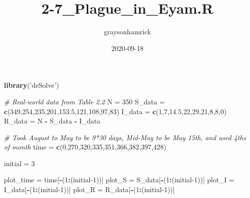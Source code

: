 \documentclass[
]{article}
\title{2-7\_Plague\_in\_Eyam.R}
\author{graysonhamrick}
\date{2020-09-18}
\newenvironment{Shaded}{\begin{snugshade}}{\end{snugshade}}
\newcommand{\CommentTok}[1]{\textcolor[rgb]{0.56,0.35,0.01}{\textit{#1}}}
\newcommand{\DecValTok}[1]{\textcolor[rgb]{0.00,0.00,0.81}{#1}}
\newcommand{\FloatTok}[1]{\textcolor[rgb]{0.00,0.00,0.81}{#1}}
\newcommand{\KeywordTok}[1]{\textcolor[rgb]{0.13,0.29,0.53}{\textbf{#1}}}
\newcommand{\NormalTok}[1]{#1}
\newcommand{\OperatorTok}[1]{\textcolor[rgb]{0.81,0.36,0.00}{\textbf{#1}}}
\newcommand{\StringTok}[1]{\textcolor[rgb]{0.31,0.60,0.02}{#1}}
\begin{document}
\maketitle

\begin{Shaded}
\begin{Highlighting}[]
\KeywordTok{library}\NormalTok{(}\StringTok{'deSolve'}\NormalTok{)}

\CommentTok{# Real-world data from Table 2.2}
\NormalTok{N =}\StringTok{ }\DecValTok{350}
\NormalTok{S_data =}\StringTok{ }\KeywordTok{c}\NormalTok{(}\DecValTok{349}\NormalTok{,}\DecValTok{254}\NormalTok{,}\DecValTok{235}\NormalTok{,}\DecValTok{201}\NormalTok{,}\FloatTok{153.5}\NormalTok{,}\DecValTok{121}\NormalTok{,}\DecValTok{108}\NormalTok{,}\DecValTok{97}\NormalTok{,}\DecValTok{83}\NormalTok{)}
\NormalTok{I_data =}\StringTok{ }\KeywordTok{c}\NormalTok{(}\DecValTok{1}\NormalTok{,}\DecValTok{7}\NormalTok{,}\FloatTok{14.5}\NormalTok{,}\DecValTok{22}\NormalTok{,}\DecValTok{29}\NormalTok{,}\DecValTok{21}\NormalTok{,}\DecValTok{8}\NormalTok{,}\DecValTok{8}\NormalTok{,}\DecValTok{0}\NormalTok{)}
\NormalTok{R_data =}\StringTok{ }\NormalTok{N }\OperatorTok{-}\StringTok{ }\NormalTok{S_data }\OperatorTok{-}\StringTok{ }\NormalTok{I_data}

\CommentTok{# Took August to May to be 9*30 days, Mid-May to be May 15th, and used 4ths of month}
\NormalTok{time =}\StringTok{ }\KeywordTok{c}\NormalTok{(}\DecValTok{0}\NormalTok{,}\DecValTok{270}\NormalTok{,}\DecValTok{320}\NormalTok{,}\DecValTok{335}\NormalTok{,}\DecValTok{351}\NormalTok{,}\DecValTok{366}\NormalTok{,}\DecValTok{382}\NormalTok{,}\DecValTok{397}\NormalTok{,}\DecValTok{428}\NormalTok{)}

\NormalTok{initial =}\StringTok{ }\DecValTok{3}

\NormalTok{plot_time =}\StringTok{ }\NormalTok{time[}\OperatorTok{-}\NormalTok{(}\DecValTok{1}\OperatorTok{:}\NormalTok{(initial}\DecValTok{-1}\NormalTok{))]}
\NormalTok{plot_S =}\StringTok{ }\NormalTok{S_data[}\OperatorTok{-}\NormalTok{(}\DecValTok{1}\OperatorTok{:}\NormalTok{(initial}\DecValTok{-1}\NormalTok{))]}
\NormalTok{plot_I =}\StringTok{ }\NormalTok{I_data[}\OperatorTok{-}\NormalTok{(}\DecValTok{1}\OperatorTok{:}\NormalTok{(initial}\DecValTok{-1}\NormalTok{))]}
\NormalTok{plot_R =}\StringTok{ }\NormalTok{R_data[}\OperatorTok{-}\NormalTok{(}\DecValTok{1}\OperatorTok{:}\NormalTok{(initial}\DecValTok{-1}\NormalTok{))]}



\end{Highlighting}
\end{Shaded}
\end{document}
